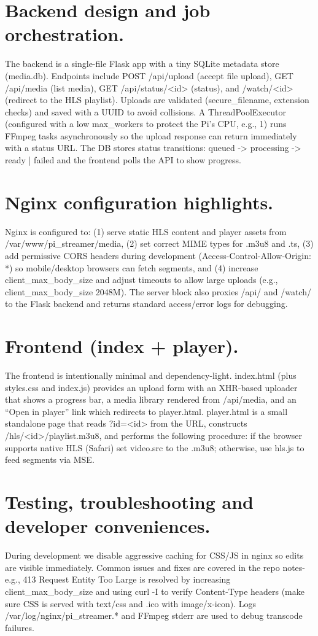 \documentclass[11pt]{report}
\begin{document}
\section{Backend design and job orchestration.}
The backend is a single-file Flask app with a tiny SQLite metadata store (media.db). Endpoints include POST /api/upload (accept file upload), GET /api/media (list media), GET /api/status/<id> (status), and /watch/<id> (redirect to the HLS playlist). Uploads are validated (secure\_filename, extension checks) and saved with a UUID to avoid collisions. A ThreadPoolExecutor (configured with a low max\_workers to protect the Pi’s CPU, e.g., 1) runs FFmpeg tasks asynchronously so the upload response can return immediately with a status URL. The DB stores status transitions: queued -> processing -> ready | failed and the frontend polls the API to show progress.

\section{Nginx configuration highlights.}
Nginx is configured to: (1) serve static HLS content and player assets from /var/www/pi\_streamer/media, (2) set correct MIME types for .m3u8 and .ts, (3) add permissive CORS headers during development (Access-Control-Allow-Origin: *) so mobile/desktop browsers can fetch segments, and (4) increase client\_max\_body\_size and adjust timeouts to allow large uploads (e.g., client\_max\_body\_size 2048M). The server block also proxies /api/ and /watch/ to the Flask backend and returns standard access/error logs for debugging.

\section{Frontend (index + player).}
The frontend is intentionally minimal and dependency-light. index.html (plus styles.css and index.js) provides an upload form with an XHR-based uploader that shows a progress bar, a media library rendered from /api/media, and an “Open in player” link which redirects to player.html. player.html is a small standalone page that reads ?id=<id> from the URL, constructs /hls/<id>/playlist.m3u8, and performs the following procedure: if the browser supports native HLS (Safari) set video.src to the .m3u8; otherwise, use hls.js to feed segments via MSE.

\section{Testing, troubleshooting and developer conveniences.}
During development we disable aggressive caching for CSS/JS in nginx so edits are visible immediately. Common issues and fixes are covered in the repo notes-e.g., 413 Request Entity Too Large is resolved by increasing client\_max\_body\_size and using curl -I to verify Content-Type headers (make sure CSS is served with text/css and .ico with image/x-icon). Logs /var/log/nginx/pi\_streamer.* and FFmpeg stderr are used to debug transcode failures.
\end{document}
